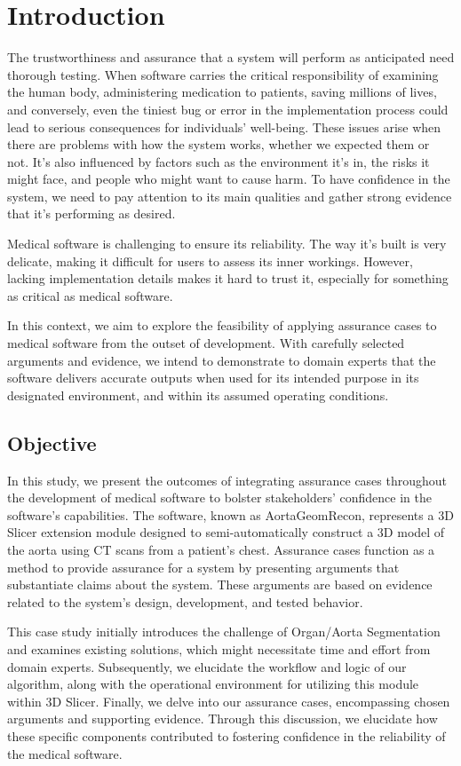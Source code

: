 \chapter{Introduction} \label{intro}
The trustworthiness and assurance that a system will perform as anticipated need thorough testing. When software carries the critical responsibility of examining the human body, administering medication to patients, saving millions of lives, and conversely, even the tiniest bug or error in the implementation process could lead to serious consequences for individuals' well-being. These issues arise when there are problems with how the system works, whether we expected them or not. It's also influenced by factors such as the environment it's in, the risks it might face, and people who might want to cause harm. To have confidence in the system, we need to pay attention to its main qualities and gather strong evidence that it's performing as desired.

Medical software is challenging to ensure its reliability. The way it's built is very delicate, making it difficult for users to assess its inner workings. However, lacking implementation details makes it hard to trust it, especially for something as critical as medical software.

In this context, we aim to explore the feasibility of applying assurance cases to medical software from the outset of development. With carefully selected arguments and evidence, we intend to demonstrate to domain experts that the software delivers accurate outputs when used for its intended purpose in its designated environment, and within its assumed operating conditions.

\section{Objective} \label{obj}
In this study, we present the outcomes of integrating assurance cases throughout the development of medical software to bolster stakeholders' confidence in the software's capabilities. The software, known as AortaGeomRecon, represents a 3D Slicer extension module designed to semi-automatically construct a 3D model of the aorta using CT scans from a patient's chest. Assurance cases function as a method to provide assurance for a system by presenting arguments that substantiate claims about the system. These arguments are based on evidence related to the system's design, development, and tested behavior.

This case study initially introduces the challenge of Organ/Aorta Segmentation and examines existing solutions, which might necessitate time and effort from domain experts. Subsequently, we elucidate the workflow and logic of our algorithm, along with the operational environment for utilizing this module within 3D Slicer. Finally, we delve into our assurance cases, encompassing chosen arguments and supporting evidence. Through this discussion, we elucidate how these specific components contributed to fostering confidence in the reliability of the medical software.

